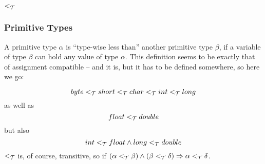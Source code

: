 \documentclass[]{article}
\begin{document}
\subsection{$<_{\cal T}$}

\subsubsection{Primitive Types}

A primitive type $\alpha$ is ``type-wise less than'' another primitive type $\beta$, if 
a variable of type $\beta$ can hold any value of type $\alpha$. This definition seems to be exactly that of assignment compatible -- and it is, but it has to be defined somewhere, so here we go:

\[
byte <_{\cal T} short <_{\cal T} char <_{\cal T} int <_{\cal T} long
\]
as well as 
\[
float <_{\cal T} double
\]
but also
\[
int <_{\cal T} float \wedge long <_{\cal T} double
\]
$<_{\cal T}$ is, of course, transitive, so if $(\alpha <_{\cal T} \beta) \wedge (\beta <_{\cal T} \delta) \Rightarrow \alpha <_{\cal T} \delta$.
\end{document}
